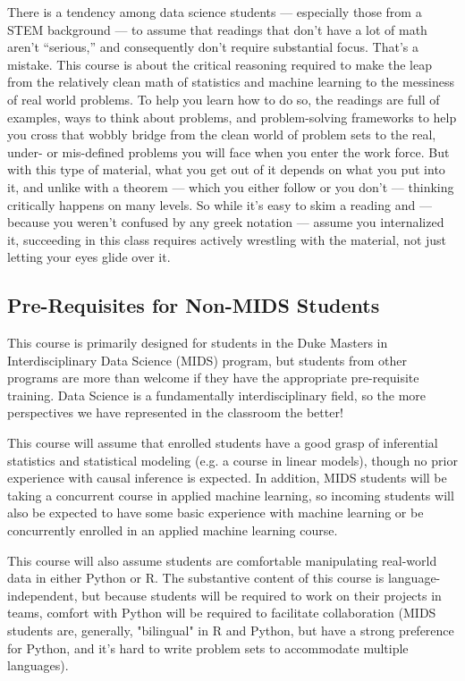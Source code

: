 \documentclass[12pt]{article}
\begin{document}
There is a tendency among data science students — especially those from a STEM background — to assume that readings that don't have a lot of math aren't ``serious,'' and consequently don't require substantial focus. That's a mistake. This course is about the critical reasoning required to make the leap from the relatively clean math of statistics and machine learning to the messiness of real world problems. To help you learn how to do so, the readings are full of examples, ways to think about problems, and problem-solving frameworks to help you cross that wobbly bridge from the clean world of problem sets to the real, under- or mis-defined problems you will face when you enter the work force. But with this type of material, what you get out of it depends on what you put into it, and unlike with a theorem — which you either follow or you don't — thinking critically happens on many levels. So while it's easy to skim a reading and — because you weren't confused by any greek notation — assume you internalized it, succeeding in this class requires actively wrestling with the material, not just letting your eyes glide over it.

\subsection{Pre-Requisites for Non-MIDS Students}

This course is primarily designed for students in the Duke Masters in Interdisciplinary Data Science (MIDS) program, but students from other programs are more than welcome if they have the appropriate pre-requisite training. Data Science is a fundamentally interdisciplinary field, so the more perspectives we have represented in the classroom the better!

This course will assume that enrolled students have a good grasp of inferential statistics and statistical modeling (e.g. a course in linear models), though no prior experience with causal inference is expected. In addition, MIDS students will be taking a concurrent course in applied machine learning, so incoming students will also be expected to have some basic experience with machine learning or be concurrently enrolled in an applied machine learning course.

This course will also assume students are comfortable manipulating real-world data in either Python or R. The substantive content of this course is language-independent, but because students will be required to work on their projects in teams, comfort with Python will be required to facilitate collaboration (MIDS students are, generally, "bilingual" in R and Python, but have a strong preference for Python, and it's hard to write problem sets to accommodate multiple languages).
\end{document}
